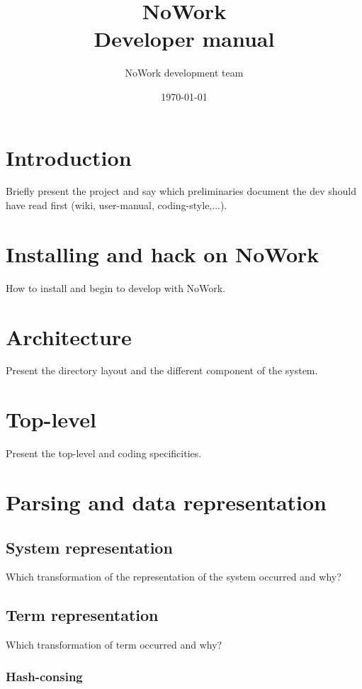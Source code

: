 \documentclass[12pt,a4paper]{article}
\title{NoWork\\
Developer manual}
\author{NoWork development team\\[2em]}
\date\today
\begin{document}
\maketitle

\section{Introduction}
Briefly present the project and say which preliminaries document the dev should have read first (wiki, user-manual, coding-style,...).

\section{Installing and hack on NoWork}
How to install and begin to develop with NoWork.

\section{Architecture}
Present the directory layout and the different component of the system.

\section{Top-level}
Present the top-level and coding specificities.

\section{Parsing and data representation}

\subsection{System representation}
Which transformation of the representation of the system occurred and why?

\subsection{Term representation}
Which transformation of term occurred and why?

\subsubsection{Hash-consing}

\end{document}
